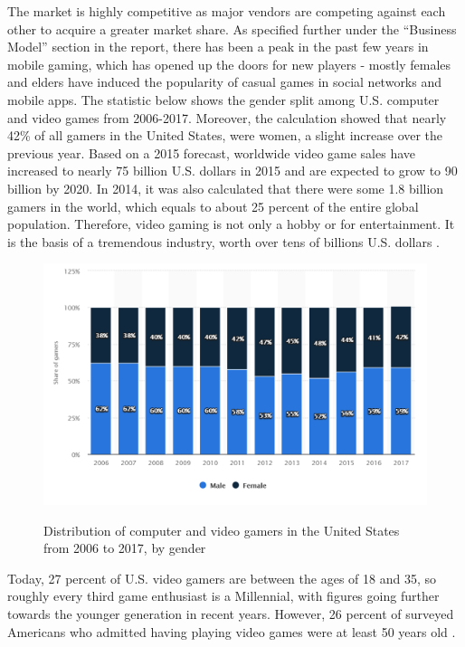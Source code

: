 \documentclass[12p]{article}
\begin{document}
The market is highly competitive as major vendors are competing against each other to acquire a greater market share. As specified further under the “Business Model” section in the report, there has been a peak in the past few years in mobile gaming, which has opened up the doors for new players - mostly females and elders have induced the popularity of casual games in social networks and mobile apps. The statistic below shows the gender split among U.S. computer and video games from 2006-2017. Moreover, the calculation showed that nearly 42\% of all gamers in the United States, were women, a slight increase over the previous year. Based on a 2015 forecast, worldwide video game sales have increased to nearly 75 billion U.S. dollars in 2015 and are expected to grow to 90 billion by 2020. In 2014, it was also calculated that there were some 1.8 billion gamers in the world, which equals to about 25 percent of the entire global population. Therefore, video gaming is not only a hobby or for entertainment. It is the basis of a tremendous industry, worth over tens of billions U.S. dollars \cite{VideoGamerGender}.


\newpage
\begin{figure}[ht]
 \center
 \includegraphics[width=1\textwidth]{BusinessStrategy/Statistics-MarketSeg}
 \label{Statistcs-MarketSeg}
 \caption{Distribution of computer and video gamers in the United States from 2006 to 2017, by gender \cite{NezooScreenshot}}
\end{figure}

Today, 27 percent of U.S. video gamers are between the ages of 18 and 35, so roughly every third game enthusiast is a Millennial, with figures going further towards the younger generation in recent years. However, 26 percent of surveyed Americans who admitted having playing video games were at least 50 years old \cite{VideoGamerGender}.
\end{document}
